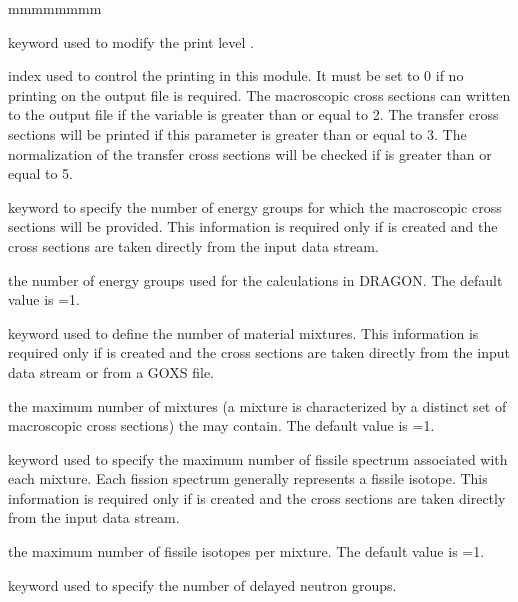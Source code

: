 \begin{ListeDeDescription}{mmmmmmmm}

\item[\moc{EDIT}] keyword used to modify the print level .

\item[\dusa{iprint}] index used to control the printing in this module.
It must be set to 0 if no printing on the output file is required. The
macroscopic cross sections can written to the output file if the
variable  is greater than or equal to 2. The transfer cross
sections will be printed if this parameter is greater than or equal to 3. The
normalization of the transfer cross sections will be checked if 
is greater than or equal to 5.

\item[\moc{NGRO}] keyword to specify the number of energy groups for which
the macroscopic cross sections will be provided. This information is required
only if  is created and the cross sections are taken directly from
the input data stream.

\item[\dusa{ngroup}] the number of energy groups used for the calculations in
DRAGON. The default value is =1. 

\item[\moc{NMIX}] keyword used to define the number of material mixtures.
This information is required only if  is created and the cross
sections are taken directly from the input data stream or from a GOXS file.

\item[\dusa{nmixt}] the maximum number of mixtures (a mixture is
characterized by a distinct set of macroscopic cross sections) the 
 may contain. The default value is =1.

\item[\moc{NIFI}] keyword used to specify the maximum number of fissile
spectrum associated with each mixture. Each fission spectrum generally
represents a fissile isotope. This information is required only if 
is created and the cross sections are taken directly from the input data stream.

\item[\dusa{nifiss}] the maximum number of fissile isotopes per mixture. The
default value is =1.

\item[\moc{DELP}] keyword used to specify the number of delayed neutron groups.


\end{ListeDeDescription}
